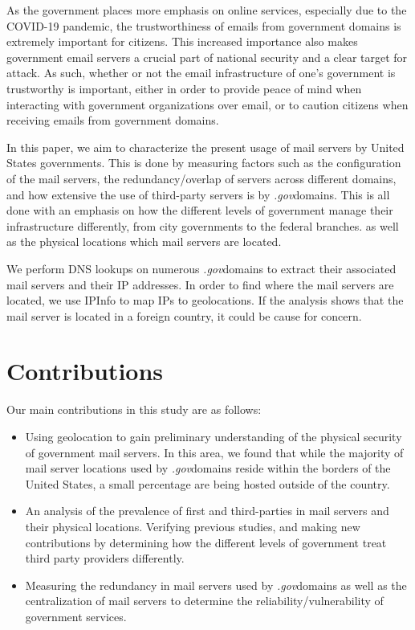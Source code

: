\documentclass{hotnets21}
\newcommand{\dotgov}{\textit{.gov}\space}
\begin{document}
As the government places more emphasis on online services, especially due to the COVID-19 pandemic, the trustworthiness of emails from government domains is extremely important for citizens.
This increased importance also makes government email servers a crucial part of national security and a clear target for attack.
As such, whether or not the email infrastructure of one’s government is trustworthy is important, either in order to provide peace of mind when interacting with government organizations over email, or to caution citizens when receiving emails from government domains.

In this paper, we aim to characterize the present usage of mail servers by United States governments.
This is done by measuring factors such as the configuration of the mail servers, the redundancy/overlap of servers across different domains, and how extensive the use of third-party servers is by \dotgov domains.
This is all done with an emphasis on how the different levels of government manage their infrastructure differently, from city governments to the federal branches. as well as the physical locations which mail servers are located.

We perform DNS lookups on numerous \dotgov domains to extract their associated mail servers and their IP addresses.
In order to find where the mail servers are located, we use IPInfo to map IPs to geolocations. If the analysis shows that the mail server is located in a foreign country, it could be cause for concern.

\section{Contributions}

Our main contributions in this study are as follows:
\begin{itemize}
\item
Using geolocation to gain preliminary understanding of the physical security of government mail servers.
In this area, we found that while the majority of mail server locations used by \dotgov domains reside within the borders of the United States, a small percentage are being hosted outside of the country.
\item
An analysis of the prevalence of first and third-parties in mail servers and their physical locations. Verifying previous studies, and making new contributions by determining how the different levels of government treat third party providers differently.
\item
Measuring the redundancy in mail servers used by \dotgov domains as well as the centralization of mail servers to determine the reliability/vulnerability of government services.
\end{itemize}
\end{document}
